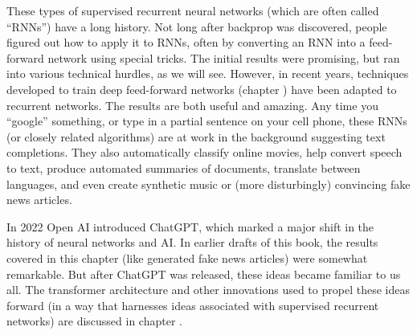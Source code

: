 These types of supervised recurrent neural networks (which are often called ``RNNs'') have a long history. Not long after backprop was discovered, people figured out how to apply it to RNNs, often by converting an RNN into a feed-forward network using special tricks. The initial results were promising, but ran into various technical hurdles, as we will see. However, in recent years, techniques developed to train deep feed-forward networks (chapter ) have been adapted to recurrent networks. The results are both useful and amazing. Any time you ``google'' something, or type in a partial sentence on your cell phone, these RNNs (or closely related algorithms) are at work in the background suggesting text completions. They also automatically classify online movies, help convert speech to text, produce automated summaries of documents, translate between languages, and even create synthetic music or (more disturbingly) convincing fake news articles.

In 2022 Open AI introduced ChatGPT, which marked a major shift in the history of neural networks and AI. In earlier drafts of this book, the results covered in this chapter (like generated fake news articles) were somewhat remarkable. But after ChatGPT was released, these ideas became familiar to us all. The transformer architecture and other innovations used to propel these ideas forward (in a way that harnesses ideas associated with supervised recurrent networks) are discussed in chapter . 

